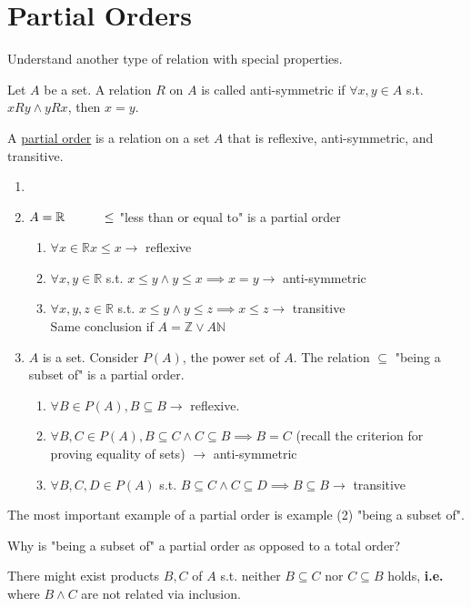 \documentclass[10pt]{article}
\begin{document}
	\section{Partial Orders}
	\begin{description}
		\item[Task:] Understand another type of relation with special properties.
		\item[Definition:] Let $A$ be a set. A relation $R$ on $A$ is called anti-symmetric if $\forall x, y \in A$ s.t. $xRy \land yRx$, then $x=y$.
		\item[Definition:] A \underline{partial order} is a relation on a set $A$ that is reflexive, anti-symmetric, and transitive.
		\item[Examples:]
		\begin{enumerate}
			\item[]
			\item $A = \mathbb{R} \hspace{10mm} \leq$ "less than or equal to" is a partial order
			\begin{enumerate}
				\item $\forall x \in \mathbb{R} x \leq x \rightarrow$ reflexive
				\item $\forall x, y \in \mathbb{R}$ s.t. $x \leq y \land y \leq x \implies x=y \rightarrow$ anti-symmetric
				\item $\forall x, y, z \in \mathbb{R}$ s.t. $x \leq y \land y \leq z \implies x \leq z \rightarrow$ transitive \\
				Same conclusion if $A = \mathbb{Z} \lor A \mathbb{N}$
			\end{enumerate}
			\item $A$ is a set. Consider $P(A)$, the power set of $A$. The relation $\subseteq$ "being a subset of" is a partial order.
			\begin{enumerate}
				\item $\forall B \in P(A), B\subseteq B \rightarrow$ reflexive.
				\item $\forall B, C \in P(A), B \subseteq C \land C \subseteq B \implies B=C$ (recall the criterion for proving equality of sets) $\rightarrow$ anti-symmetric
				\item $\forall B, C, D \in P(A)$ s.t. $B \subseteq C \land C \subseteq D \implies B \subseteq B \rightarrow$ transitive
			\end{enumerate}
		\end{enumerate}
		\item The most important example of a partial order is example (2) "being a subset of".
		\item[Q:] Why is "being a subset of" a partial order as opposed to a total order?
		\item[A:] There might exist products $B, C$ of $A$ s.t. neither $B \subseteq C$ nor $C \subseteq B$ holds, \textbf{i.e.} where $B \land C$ are not related via inclusion.
	\end{description}
	
\end{document}
